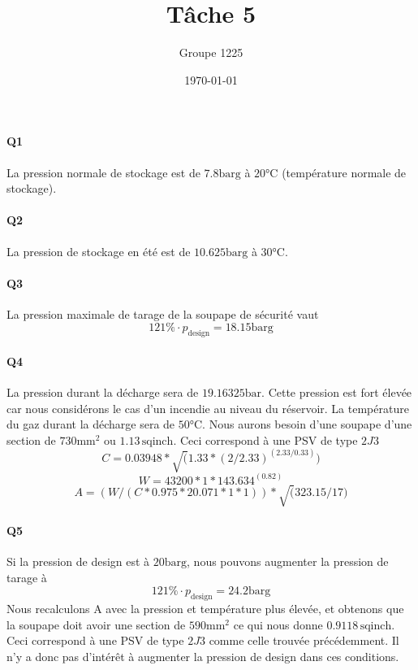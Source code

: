 \documentclass[a4paper,oneside,12pt]{article}
\title{T\^ache 5}
\author{Groupe 1225}
\date{\today}
\newcommand{\barg}{\si{\bar}\text{g}}
\begin{document}
\maketitle

\paragraph{Q1} La pression normale de stockage est de $7.8 \barg$ à $20\si{\celsius}$ 
(température normale de stockage).

\paragraph{Q2} La pression de stockage en été est de $10.625 \barg$ à $30\si{\celsius}$.

\paragraph{Q3} La pression maximale de tarage de la soupape de sécurité vaut 
\[ 121\% \cdot p_{\text{design}} = 18.15\barg \]

\paragraph{Q4} 
La pression durant la décharge sera de $19.16325 \si{\bar}$. 
Cette pression est fort élevée car nous considérons le cas d'un incendie au niveau du réservoir. 
La température du gaz durant la décharge sera de $50\si{\celsius}$. 
Nous aurons besoin d'une soupape d'une section de $730\si{\milli\meter\squared}$ 
ou $1.13 \, \text{sqinch}$. Ceci correspond à une PSV de type $2J3$
\[ C = 0.03948 * \sqrt(1.33 * (2 / 2.33)^(2.33 / 0.33)) \]
\[ W = 43200 * 1 * 143.634^(0.82) \]
\[ A = (W / (C * 0.975 * 20.071 * 1 * 1)) * \sqrt(323.15/17) \]

\paragraph{Q5} 
Si la pression de design est à $20\barg$, nous pouvons augmenter la pression de tarage à \[ 121\% \cdot p_{\text{design}} = 24.2\barg \]
Nous recalculons A avec la pression et température plus élevée, et obtenons que la soupape doit avoir une section de $590\si{\milli\meter\squared}$
ce qui nous donne $0.9118 \, \text{sqinch}$. Ceci correspond à une PSV de type $2J3$ comme celle trouvée précédemment. Il n'y a donc pas d'intérêt
à augmenter la pression de design dans ces conditions.
\end{document}
